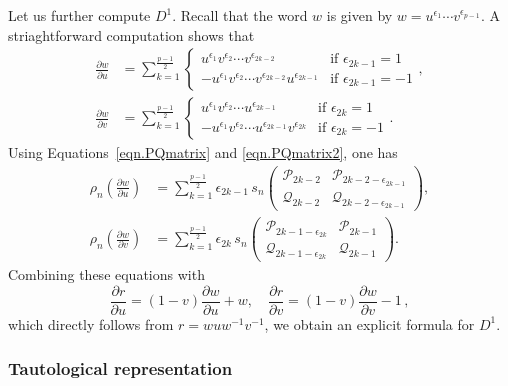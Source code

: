 \documentclass{amsart}
\def\calP{\mathcal{P}}
\def\calQ{\mathcal{Q}}
\theoremstyle{definition}
\begin{document}
Let us further compute $D^1$.  
Recall that the word $w$ is given by $w=u^{\epsilon_1}\cdots v^{\epsilon_{p-1}}$. A striaghtforward computation shows that
\begin{align*}
    \frac{\partial w}{\partial u}&=  \sum_{k=1}^{\frac{p-1}{2}}
    \begin{cases}
        u^{\epsilon_1}v^{\epsilon_2}\cdots v^{\epsilon_{2k-2}} & \text{if }\epsilon_{2k-1}=1 \\
        -u^{\epsilon_1}v^{\epsilon_2}\cdots v^{\epsilon_{2k-2}}u^{\epsilon_{2k-1}} & \text{if }\epsilon_{2k-1}=-1 
    \end{cases}, \\[2pt]
    \frac{\partial w}{\partial v}&=\sum_{k=1}^{\frac{p-1}{2}}
    \begin{cases}
        u^{\epsilon_1}v^{\epsilon_2}\cdots u^{\epsilon_{2k-1}} &\text{if }\epsilon_{2k}=1 \\
        -u^{\epsilon_1}v^{\epsilon_2}\cdots u^{\epsilon_{2k-1}}v^{\epsilon_{2k}} & \text{if }\epsilon_{2k}=-1
    \end{cases}.
\end{align*}
Using Equations~\eqref{eqn.PQmatrix} and \eqref{eqn.PQmatrix2}, one has
\begin{align}
    \label{wu}
    \rho_n \! \left(\frac{\partial w}{\partial u}\right) &=\sum_{k=1}^{\frac{p-1}{2}}\epsilon_{2k-1} \, s_n\! \begin{pmatrix} \calP_{2k-2} & \calP_{2k-2-\epsilon_{2k-1}} \\ \calQ_{2k-2} & \calQ_{2k-2-\epsilon_{2k-1}}\end{pmatrix},\\
    \label{wv}
    \rho_n \! \left(\frac{\partial w}{\partial v}\right)&=\sum_{k=1}^{\frac{p-1}{2}}\epsilon_{2k} \, s_n \! \begin{pmatrix} \calP_{2k-1-\epsilon_{2k}} & \calP_{2k-1} \\ \calQ_{2k-1-\epsilon_{2k}} & \calQ_{2k-1}\end{pmatrix}.
\end{align}
Combining these equations with 
\begin{equation}\label{fox}
\frac{\partial r}{\partial u}= (1-v) \frac{\partial w}{\partial u}+w,\quad \frac{\partial r}{\partial v}=(1-v)\frac{\partial w}{\partial v}-1 \,,
\end{equation}
which directly follows from $r=wuw^{-1}v^{-1}$, we obtain an explicit formula for $D^1$.




\subsubsection{Tautological representation}
\end{document}
